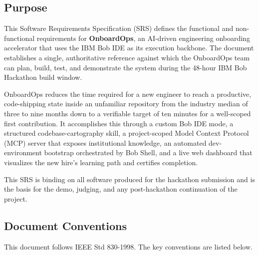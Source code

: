 \documentclass[11pt,letterpaper]{article}
\begin{document}
\subsection{Purpose}

This Software Requirements Specification (SRS) defines the functional and non-functional requirements for \textbf{OnboardOps}, an AI-driven engineering onboarding accelerator that uses the IBM Bob IDE as its execution backbone. The document establishes a single, authoritative reference against which the OnboardOps team can plan, build, test, and demonstrate the system during the 48-hour IBM Bob Hackathon build window.

OnboardOps reduces the time required for a new engineer to reach a productive, code-shipping state inside an unfamiliar repository from the industry median of three to nine months down to a verifiable target of ten minutes for a well-scoped first contribution. It accomplishes this through a custom Bob IDE mode, a structured codebase-cartography skill, a project-scoped Model Context Protocol (MCP) server that exposes institutional knowledge, an automated dev-environment bootstrap orchestrated by Bob Shell, and a live web dashboard that visualizes the new hire's learning path and certifies completion.

This SRS is binding on all software produced for the hackathon submission and is the basis for the demo, judging, and any post-hackathon continuation of the project.

\subsection{Document Conventions}

This document follows IEEE Std 830-1998. The key conventions are listed below.
\end{document}
